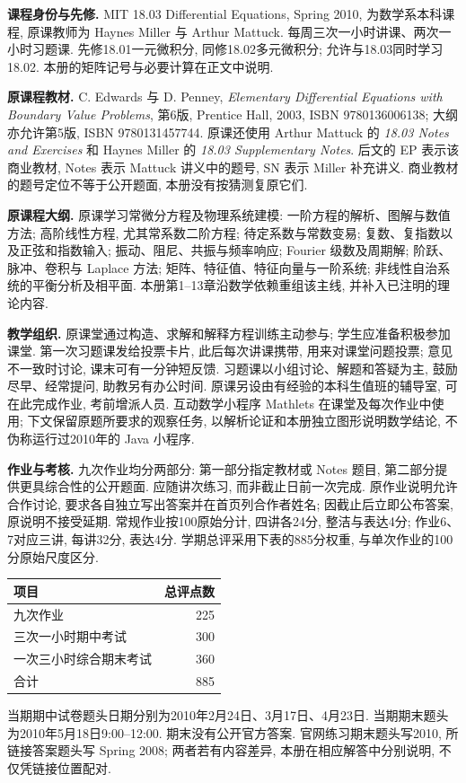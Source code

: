 \clearpage
{}
{}
\par

\noindent\textbf{课程身份与先修.} MIT 18.03 Differential Equations, Spring 2010, 为数学系本科课程, 原课教师为 Haynes Miller 与 Arthur Mattuck. 每周三次一小时讲课、两次一小时习题课. 先修18.01一元微积分, 同修18.02多元微积分; 允许与18.03同时学习18.02. 本册的矩阵记号与必要计算在正文中说明.

\noindent\textbf{原课程教材.} C. Edwards 与 D. Penney, \textit{Elementary Differential Equations with Boundary Value Problems}, 第6版, Prentice Hall, 2003, ISBN 9780136006138; 大纲亦允许第5版, ISBN 9780131457744. 原课还使用 Arthur Mattuck 的 \textit{18.03 Notes and Exercises} 和 Haynes Miller 的 \textit{18.03 Supplementary Notes}. 后文的 EP 表示该商业教材, Notes 表示 Mattuck 讲义中的题号, SN 表示 Miller 补充讲义. 商业教材的题号定位不等于公开题面, 本册没有按猜测复原它们.

\noindent\textbf{原课程大纲.} 原课学习常微分方程及物理系统建模: 一阶方程的解析、图解与数值方法; 高阶线性方程, 尤其常系数二阶方程; 待定系数与常数变易; 复数、复指数以及正弦和指数输入; 振动、阻尼、共振与频率响应; Fourier 级数及周期解; 阶跃、脉冲、卷积与 Laplace 方法; 矩阵、特征值、特征向量与一阶系统; 非线性自治系统的平衡分析及相平面. 本册第1--13章沿数学依赖重组该主线, 并补入已注明的理论内容.

\noindent\textbf{教学组织.} 原课堂通过构造、求解和解释方程训练主动参与; 学生应准备积极参加课堂. 第一次习题课发给投票卡片, 此后每次讲课携带, 用来对课堂问题投票; 意见不一致时讨论, 课末可有一分钟短反馈. 习题课以小组讨论、解题和答疑为主, 鼓励尽早、经常提问, 助教另有办公时间. 原课另设由有经验的本科生值班的辅导室, 可在此完成作业, 考前增派人员. 互动数学小程序 Mathlets 在课堂及每次作业中使用; 下文保留原题所要求的观察任务, 以解析论证和本册独立图形说明数学结论, 不伪称运行过2010年的 Java 小程序.

\noindent\textbf{作业与考核.} 九次作业均分两部分: 第一部分指定教材或 Notes 题目, 第二部分提供更具综合性的公开题面. 应随讲次练习, 而非截止日前一次完成. 原作业说明允许合作讨论, 要求各自独立写出答案并在首页列合作者姓名; 因截止后立即公布答案, 原说明不接受延期. 常规作业按100原始分计, 四讲各24分, 整洁与表达4分; 作业6、7对应三讲, 每讲32分, 表达4分. 学期总评采用下表的885分权重, 与单次作业的100分原始尺度区分.
\begin{center}
\begin{tabular}{lr}\toprule 项目 & 总评点数 \\\midrule
九次作业 & 225 \\
三次一小时期中考试 & 300 \\
一次三小时综合期末考试 & 360 \\\midrule
合计 & 885 \\\bottomrule
\end{tabular}
\end{center}
当期期中试卷题头日期分别为2010年2月24日、3月17日、4月23日. 当期期末题头为2010年5月18日9:00--12:00. 期末没有公开官方答案. 官网练习期末题头写2010, 所链接答案题头写 Spring 2008; 两者若有内容差异, 本册在相应解答中分别说明, 不仅凭链接位置配对.

